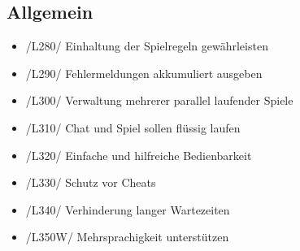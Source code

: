 \documentclass{article}
\begin{document}
\subsection{Allgemein}
\begin{itemize}
	\item /L280/ Einhaltung der Spielregeln gewährleisten
	\item /L290/ Fehlermeldungen akkumuliert ausgeben
	\item /L300/ Verwaltung mehrerer parallel laufender Spiele
	\item /L310/ Chat und Spiel sollen flüssig laufen
	\item /L320/ Einfache und hilfreiche Bedienbarkeit
	\item /L330/ Schutz vor Cheats
	\item /L340/ Verhinderung langer Wartezeiten
	\item /L350W/ Mehrsprachigkeit unterstützen
\end{itemize}
\end{document}
